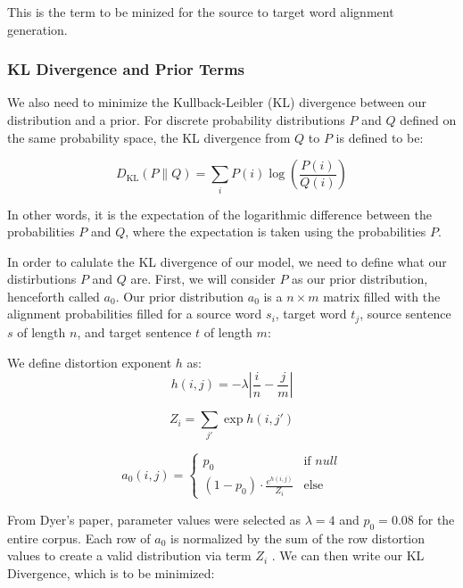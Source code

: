 \documentclass[twoside,twocolumn]{article}
\begin{document}
This is the term to be minized for the source to target word alignment generation.

\subsubsection{KL Divergence and Prior Terms}

We also need to minimize the Kullback-Leibler (KL) divergence between our distribution and a prior. For discrete probability distributions $P$ and $Q$ defined on the same probability space, the KL divergence from $Q$ to $P$ is defined to be:

\begin{equation}
D _ { \mathrm { KL } } ( P \| Q ) = \sum _ { i } P ( i ) \log \left( \frac { P ( i ) } { Q ( i ) } \right)
\end{equation}

In other words, it is the expectation of the logarithmic difference between the probabilities $P$ and $Q$, where the expectation is taken using the probabilities $P$.

In order to calulate the KL divergence of our model, we need to define what our distirbutions $P$ and $Q$ are. First, we will consider $P$ as our prior distribution, henceforth called $a_0$. Our prior distribution $a_0$ is a $n \times m$ matrix filled with the alignment probabilities filled for a source word $s_i$, target word $t_j$, source sentence $s$ of length $n$, and target sentence $t$ of length $m$:

We define distortion exponent $h$ as:
\begin{equation}
  h(i, j) = {-\lambda \left| \frac{i}{n} - \frac{j}{m}\right|}
\end{equation}

\begin{equation}
  Z_i = \sum_{j'} \exp h(i, j')
\end{equation}

\begin{equation}
a_0 (i, j) =
\begin{cases}
      p_0 & \text{if } null \\
     (1-p_0) \cdot \frac{e^{h(i,j)}}{Z_i} & \text{else}
   \end{cases}
\end{equation}

From Dyer's paper, parameter values were selected as $\lambda=4$ and $p_0=0.08$ for the entire corpus. Each row of $a_0$ is normalized by the sum of the row distortion values to create a valid distribution via term $Z_i$ \cite{dyer2013simple}. We can then write our KL Divergence, which is to be minimized:
\end{document}
